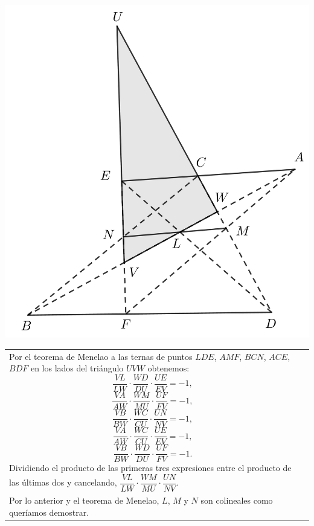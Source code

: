 \documentclass[12pt,a4paper, oneside]{book}
\begin{document}
\begin{center}
\includegraphics[scale=0.48]{Imagenes/pappus2.png} 
\end{center}
\newpage
\begin{tabular}{p{15.9 cm} p{1cm}}
Por el teorema de Menelao a las ternas de puntos $LDE$, $AMF$, $BCN$, $ACE$, $BDF$ en los lados del triángulo $UVW$ obtenemos:
$$\dfrac{VL}{LW}\cdot \dfrac{WD}{DU}\cdot \dfrac{UE}{EV}=-1,$$
$$\dfrac{VA}{AW}\cdot \dfrac{WM}{MU}\cdot \dfrac{UF}{FV}=-1,$$
$$\dfrac{VB}{BW}\cdot \dfrac{WC}{CU}\cdot \dfrac{UN}{NV}=-1,$$
$$\dfrac{VA}{AW}\cdot \dfrac{WC}{CU}\cdot \dfrac{UE}{EV}=-1,$$
$$\dfrac{VB}{BW}\cdot \dfrac{WD}{DU}\cdot \dfrac{UF}{FV}=-1.$$
Dividiendo el producto de las primeras tres expresiones entre el producto de las últimas dos y cancelando, $\dfrac{VL}{LW} \cdot \dfrac{WM}{MU} \cdot \dfrac{UN}{NV}.$
\\Por lo anterior y el teorema de Menelao, $L$, $M$ y $N$ son colineales como queríamos demostrar.

\end{tabular}
\end{document}
